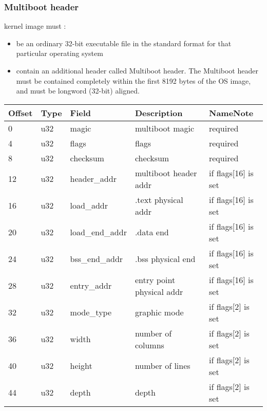 \begin{frame}
  \frametitle{Multiboot header}
  kernel image must :

  \begin{itemize}
  \item be an ordinary 32-bit executable file in the standard format for that particular operating system
  \item contain an additional header called Multiboot header. The Multiboot header must be contained completely within the first 8192 bytes of the OS image, and must be longword (32-bit) aligned.
  \end{itemize}

  \begin{tabular}{|l|l|l|l|l|}
  \hline
  Offset & Type & Field & Description & NameNote\\\hline\hline
  0 & u32 & magic & multiboot magic & required\\\hline
  4 & u32 & flags & flags & required\\\hline
  8 & u32 & checksum & checksum & required\\\hline
  12 & u32 & header\_addr & multiboot header addr & if flags[16] is set\\\hline
  16 & u32 & load\_addr & .text physical addr & if flags[16] is set\\\hline
  20 & u32 & load\_end\_addr & .data end & if flags[16] is set\\\hline
  24 & u32 & bss\_end\_addr & .bss physical end & if flags[16] is set\\\hline
  28 & u32 & entry\_addr & entry point physical addr & if flags[16] is set\\\hline
  32 & u32 & mode\_type  & graphic mode & if flags[2] is set\\\hline
  36 & u32 & width & number of columns & if flags[2] is set\\\hline
  40 & u32 & height & number of lines & if flags[2] is set\\\hline
  44 & u32 & depth & depth & if flags[2] is set\\\hline
  \end{tabular}

\end{frame}

%
%
%

